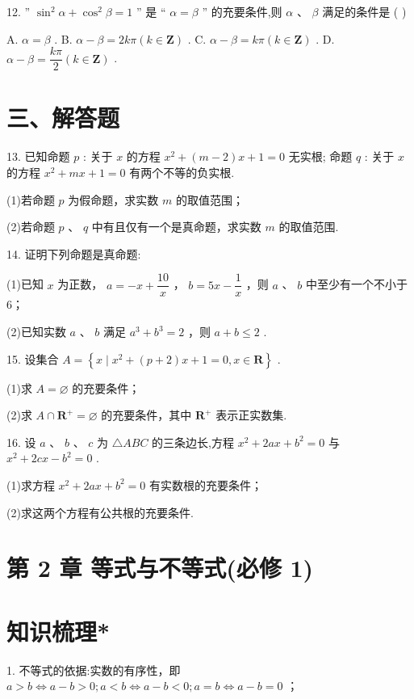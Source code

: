 12. ” ${\sin }^{2}\alpha  + {\cos }^{2}\beta  = 1$ ” 是 “ $\alpha  = \beta$ ” 的充要条件,则 $\alpha$ 、 $\beta$ 满足的条件是 ( )

A. $\alpha  = \beta$ . B. $\alpha  - \beta  = {2k\pi }\left( {k \in  \mathbf{Z}}\right)$ . C. $\alpha  - \beta  = {k\pi }\left( {k \in  \mathbf{Z}}\right)$ . D. $\alpha  - \beta  = \dfrac{k\pi }{2}\left( {k \in  \mathbf{Z}}\right)$ .

\section*{三、解答题}

13. 已知命题 $p$ : 关于 $x$ 的方程 ${x}^{2} + \left( {m - 2}\right) x + 1 = 0$ 无实根; 命题 $q$ : 关于 $x$ 的方程 ${x}^{2} + {mx} + 1 = 0$ 有两个不等的负实根.

(1)若命题 $p$ 为假命题，求实数 $m$ 的取值范围；

(2)若命题 $p$ 、 $q$ 中有且仅有一个是真命题，求实数 $m$ 的取值范围.

14. 证明下列命题是真命题:

(1)已知 $x$ 为正数， $a =  - x + \dfrac{10}{x}$ ， $b = {5x} - \dfrac{1}{x}$ ，则 $a$ 、 $b$ 中至少有一个不小于 6；

(2)已知实数 $a$ 、 $b$ 满足 ${a}^{3} + {b}^{3} = 2$ ，则 $a + b \leq  2$ .

15. 设集合 $A = \left\{  {x \mid  {x}^{2} + \left( {p + 2}\right) x + 1 = 0,x \in  \mathbf{R}}\right\}$ .

(1)求 $A = \varnothing$ 的充要条件；

(2)求 $A \cap  {\mathbf{R}}^{ + } = \varnothing$ 的充要条件，其中 ${\mathbf{R}}^{ + }$ 表示正实数集.

16. 设 $a$ 、 $b$ 、 $c$ 为 $\bigtriangleup {ABC}$ 的三条边长,方程 ${x}^{2} + {2ax} + {b}^{2} = 0$ 与 ${x}^{2} + {2cx} - {b}^{2} = 0$ .

(1)求方程 ${x}^{2} + {2ax} + {b}^{2} = 0$ 有实数根的充要条件；

(2)求这两个方程有公共根的充要条件.

\section*{第 2 章 等式与不等式(必修 1)}

\section*{知识梳理*}

1. 不等式的依据:实数的有序性，即 $a > b \Leftrightarrow  a - b > 0;a < b \Leftrightarrow  a - b < 0;a = b \Leftrightarrow  a - b = 0$ ；

